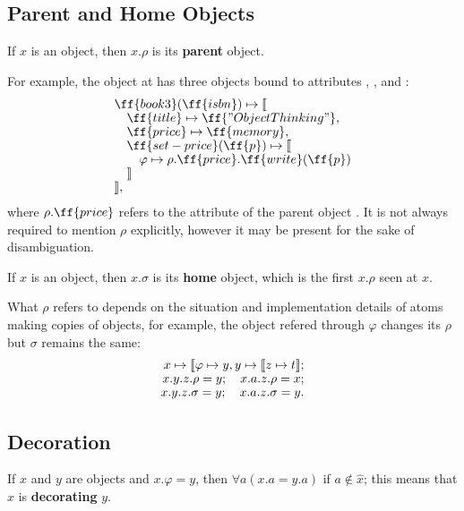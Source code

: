\subsection{Parent and Home Objects}

\begin{eodefinition}\label{def:parent}
If $x$ is an object, then $x.\rho$ is its \textbf{parent} object.
\end{eodefinition}

For example, the object at 
has three objects bound to attributes , , and :
\begin{equation}\label{eq:book3}
\begin{split}
& \ff{book3}(\ff{isbn}) \mapsto \llbracket \br
& \quad \ff{title} \mapsto \ff{"Object Thinking"}, \br
& \quad \ff{price} \mapsto \ff{memory}, \br
& \quad \ff{set-price}(\ff{p}) \mapsto \llbracket \br
& \quad \quad \varphi \mapsto \rho.\ff{price}.\ff{write}(\ff{p}) \br
& \quad \rrbracket \br
& \rrbracket, \\
\end{split}
\end{equation}
where $\rho.\ff{price}$ refers to the attribute 
of the parent object . It is not always required to mention
$\rho$ explicitly, however it may be present for the sake of
disambiguation.

\begin{eodefinition}\label{def:parent}
If $x$ is an object, then $x.\sigma$ is its \textbf{home} object, which
is the first $x.\rho$ seen at $x$.
\end{eodefinition}

What $\rho$ refers to depends on the situation and implementation
details of atoms making copies of objects, for example,
the object refered through $\varphi$ changes its $\rho$ but
$\sigma$ remains the same:
\begin{equation}
\begin{split}
x \mapsto \llbracket \varphi \mapsto y, y \mapsto \llbracket z \mapsto t \rrbracket; \br
x.y.z.\rho = y; \quad x.a.z.\rho = x; \br
x.y.z.\sigma = y; \quad x.a.z.\sigma = y.
\end{split}
\end{equation}

\subsection{Decoration}

\begin{eodefinition}\label{def:decorator}
If $x$ and $y$ are objects and $x.\varphi = y$, then
  $\forall a (x.a = y.a)$ if $a \not\in \hat{x}$;
  this means that $x$ is \textbf{decorating} $y$.
\end{eodefinition}

